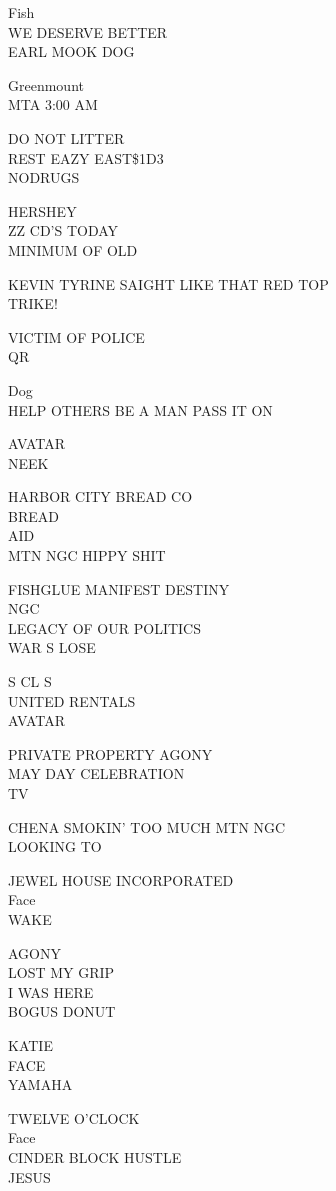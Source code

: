 \documentclass[10pt,letterpaper]{article}
\begin{document}
Fish\\
WE DESERVE BETTER\\
EARL MOOK DOG

Greenmount\\
MTA 3:00 AM

DO NOT LITTER\\
REST EAZY EAST\$1D3\\
NODRUGS

HERSHEY\\
ZZ CD'S TODAY\\
MINIMUM OF OLD

KEVIN TYRINE SAIGHT LIKE THAT RED TOP\\
TRIKE!

VICTIM OF POLICE\\
QR

Dog\\
HELP OTHERS BE A MAN PASS IT ON

AVATAR\\
NEEK

HARBOR CITY BREAD CO\\
BREAD\\
AID\\
MTN NGC HIPPY SHIT

FISHGLUE MANIFEST DESTINY\\
NGC\\
LEGACY OF OUR POLITICS\\
WAR S LOSE

S CL S\\
UNITED RENTALS\\
AVATAR

PRIVATE PROPERTY AGONY\\
MAY DAY CELEBRATION\\
TV

CHENA SMOKIN' TOO MUCH MTN NGC\\
LOOKING TO

JEWEL HOUSE INCORPORATED\\
Face\\
WAKE

AGONY\\
LOST MY GRIP\\
I WAS HERE\\
BOGUS DONUT

KATIE\\
FACE\\
YAMAHA

TWELVE O'CLOCK\\
Face\\
CINDER BLOCK HUSTLE\\
JESUS
\end{document}

